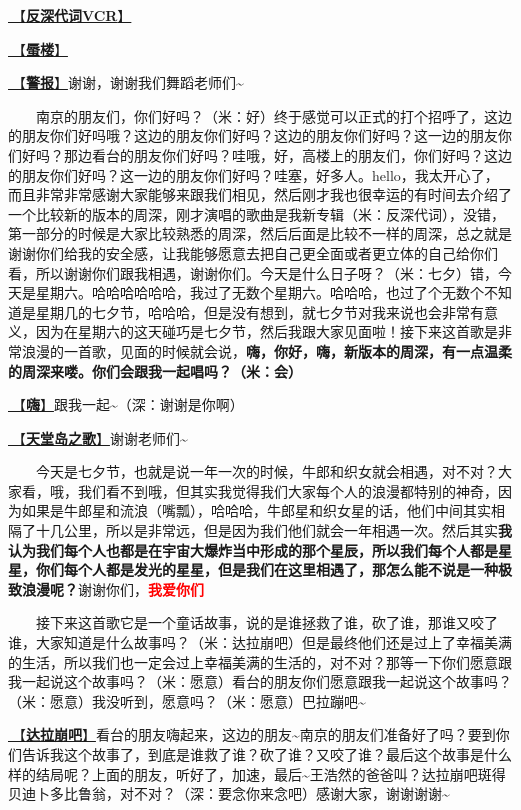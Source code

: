 \documentclass[]{ctexbook}
\begin{document}
\hyperref[senself-vcr]{🎥【\textbf{反深代词VCR}】}

\hyperref[mirage]{🎵【\textbf{蜃楼}】}

\hyperref[the-giver]{🎵【\textbf{警报}】}谢谢，谢谢我们舞蹈老师们\textasciitilde{}

  南京的朋友们，你们好吗？（米：好）终于感觉可以正式的打个招呼了，这边的朋友你们好吗哦？这边的朋友你们好吗？这边的朋友你们好吗？这一边的朋友你们好吗？那边看台的朋友你们好吗？哇哦，好，高楼上的朋友们，你们好吗？这边的朋友你们好吗？这一边的朋友你们好吗？哇塞，好多人。hello，我太开心了，而且非常非常感谢大家能够来跟我们相见，然后刚才我也很幸运的有时间去介绍了一个比较新的版本的周深，刚才演唱的歌曲是我新专辑（米：反深代词），没错，第一部分的时候是大家比较熟悉的周深，然后后面是比较不一样的周深，总之就是谢谢你们给我的安全感，让我能够愿意去把自己更全面或者更立体的自己给你们看，所以谢谢你们跟我相遇，谢谢你们。今天是什么日子呀？（米：七夕）错，今天是星期六。哈哈哈哈哈哈，我过了无数个星期六。哈哈哈，也过了个无数个不知道是星期几的七夕节，哈哈哈，但是没有想到，就七夕节对我来说也会非常有意义，因为在星期六的这天碰巧是七夕节，然后我跟大家见面啦！接下来这首歌是非常浪漫的一首歌，见面的时候就会说，\textbf{嗨，你好，嗨，新版本的周深，有一点温柔的周深来喽。你们会跟我一起唱吗？（米：会）}

\hyperref[say-hi]{🎵【\textbf{嗨}】}跟我一起\textasciitilde（深：谢谢是你啊）

\hyperref[haven-song]{🎵【\textbf{天堂岛之歌}】}谢谢老师们\textasciitilde{}

  今天是七夕节，也就是说一年一次的时候，牛郎和织女就会相遇，对不对？大家看，哦，我们看不到哦，但其实我觉得我们大家每个人的浪漫都特别的神奇，因为如果是牛郎星和流浪（嘴瓢），哈哈哈，牛郎星和织女星的话，他们中间其实相隔了十几公里，所以是非常远，但是因为我们他们就会一年相遇一次。然后其实\textbf{我认为我们每个人也都是在宇宙大爆炸当中形成的那个星辰，所以我们每个人都是星星，你们每个人都是发光的星星，但是我们在这里相遇了，那怎么能不说是一种极致浪漫呢？}谢谢你们，\textbf{\textcolor{red}{我爱你们~} }

  接下来这首歌它是一个童话故事，说的是谁拯救了谁，砍了谁，那谁又咬了谁，大家知道是什么故事吗？（米：达拉崩吧）但是最终他们还是过上了幸福美满的生活，所以我们也一定会过上幸福美满的生活的，对不对？那等一下你们愿意跟我一起说这个故事吗？（米：愿意）看台的朋友你们愿意跟我一起说这个故事吗？（米：愿意）我没听到，愿意吗？（米：愿意）巴拉蹦吧\textasciitilde{}

\hyperref[dalabengba]{🎵【\textbf{达拉崩吧}】}看台的朋友嗨起来，这边的朋友\textasciitilde 南京的朋友们准备好了吗？要到你们告诉我这个故事了，到底是谁救了谁？砍了谁？又咬了谁？最后这个故事是什么样的结局呢？上面的朋友，听好了，加速，最后\textasciitilde 王浩然的爸爸叫？达拉崩吧斑得贝迪卜多比鲁翁，对不对？（深：要念你来念吧）感谢大家，谢谢谢谢\textasciitilde{}
\end{document}
